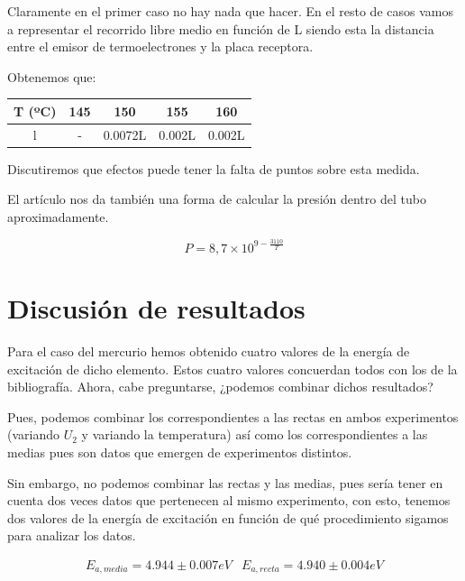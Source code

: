 \documentclass{article}
\begin{document}
Claramente en el primer caso no hay nada que hacer. En el resto de casos vamos a representar el recorrido libre medio en función de L siendo esta la distancia entre el emisor de termoelectrones y la placa receptora.

Obtenemos que:

\begin{center}
\begin{tabular}{|c|c|c|c|c|}
\hline
T (ºC) & 145 & 150 & 155 & 160 \\ \hline \hline
l & - & 0.0072L & 0.002L & 0.002L \\ \hline
\end{tabular}
\end{center}

Discutiremos que efectos puede tener la falta de puntos sobre esta medida.

El artículo \cite{Rubenza} nos da también una forma de calcular la presión dentro del tubo aproximadamente.

\begin{equation}
P = 8,7 \times 10^{9 - \frac{3110}{T}}
\end{equation}

\section{Discusión de resultados}

Para el caso del mercurio hemos obtenido cuatro valores de la energía de excitación de dicho elemento. Estos cuatro valores concuerdan todos con los de la bibliografía. Ahora, cabe preguntarse, ¿podemos combinar dichos resultados?

Pues, podemos combinar los correspondientes a las rectas en ambos experimentos (variando $U_2$ y variando la temperatura) así como los correspondientes a las medias pues son datos que emergen de experimentos distintos.

Sin embargo, no podemos combinar las rectas y las medias, pues sería tener en cuenta dos veces datos que pertenecen al mismo experimento, con esto, tenemos dos valores de la energía de excitación en función de qué procedimiento sigamos para analizar los datos.

$$
\begin{array}{cc}
E_{a, media} = 4.944 \pm 0.007 eV & E_{a, recta} = 4.940 \pm 0.004 eV
\end{array}
$$
\end{document}

